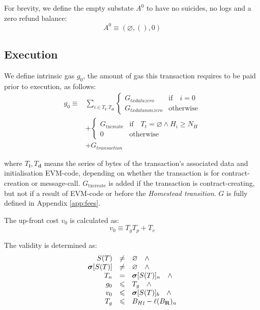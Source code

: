 \documentclass[UTF8,nofonts]{ctexart}
\newcommand{\firsthomesteadblock}{\ensuremath{N_H}}
\begin{document}
\begin{multicols}{2}
For brevity, we define the empty substate $A^0$ to have no suicides, no logs and a zero refund balance:
\begin{equation}
A^0 \equiv (\varnothing, (), 0)
\end{equation}

\subsection{Execution}
We define intrinsic gas $g_0$, the amount of gas this transaction requires to be paid prior to execution, as follows:
\begin{align}
g_0 \equiv {} & \sum_{i \in T_\mathbf{i}, T_\mathbf{d}} \begin{cases} G_{txdatazero} & \text{if} \quad i = 0 \\ G_{txdatanonzero} & \text{otherwise} \end{cases} \\
{} & + \begin{cases} G_\text{txcreate} & \text{if} \quad T_t = \varnothing \wedge H_i \geq \firsthomesteadblock \\ 0 & \text{otherwise} \end{cases} \\
{} & + G_{transaction}
\end{align}

where $T_\mathbf{i},T_\mathbf{d}$ means the series of bytes of the transaction's associated data and initialisation EVM-code, depending on whether the transaction is for contract-creation or message-call. $G_\text{txcreate}$ is added if the transaction is contract-creating, but not if a result of EVM-code or before the {\it Homestead transition}. $G$ is fully defined in Appendix \ref{app:fees}.


The up-front cost $v_0$ is calculated as:
\begin{equation}
v_0 \equiv T_g T_p + T_v
\end{equation}

The validity is determined as:
\begin{equation}
\begin{array}[t]{rcl}
S(T) & \neq & \varnothing \quad \wedge \\
\boldsymbol{\sigma}[S(T)] & \neq & \varnothing \quad \wedge \\
T_n & = & \boldsymbol{\sigma}[S(T)]_n \quad \wedge \\
g_0 & \leqslant & T_g \quad \wedge \\ 
v_0 & \leqslant & \boldsymbol{\sigma}[S(T)]_b \quad \wedge \\
T_g & \leqslant & {B_H}_l - \ell(B_\mathbf{R})_u
\end{array}
\end{equation}


\end{multicols}
\end{document}
